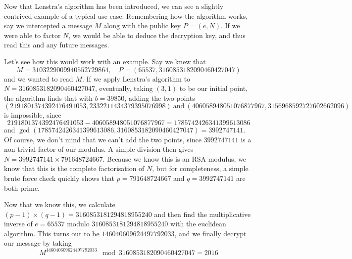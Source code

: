 
Now that Lenstra's algorithm has been introduced, we can see a slightly contrived example of a typical use case. Remembering how the algorithm works, say we intercepted a message $M$ along with the public key $P = (e,N)$. If we were able to factor $N$, we would be able to deduce the decryption key, and thus read this and any future messages. 

Let's see how this would work with an example. Say we knew that
$$ M = 3103229009940552729864,\quad P = (65537, 3160853182090460427047) $$
and we wanted to read $M$. If we apply Lenstra's algorithm to $N = 3160853182090460427047$, eventually, taking $(3,1)$ to be our initial point, the algorithm finds that with $b = 39850$, adding the two points
$$(2191801374392476491053, 2332211434379395076998)\ \text{and}\ (406058948051076877967, 3156968592727602662096)$$
is impossible, since 
$$2191801374392476491053-406058948051076877967 = 1785742426341399613086$$ and $\gcd(1785742426341399613086, 3160853182090460427047) = 3992747141$. Of course, we don't mind that we can't add the two points, since $3992747141$ is a non-trivial factor of our modulus. A simple division then gives $N = 3992747141 \times 791648724667$. Because we know this is an RSA modulus, we know that this is the complete factorisation of $N$, but for completeness, a simple brute force check quickly shows that $p = 791648724667$ and $q = 3992747141$ are both prime.

Now that we know this, we calculate $(p-1) \times (q-1) = 3160853181294818955240$ and then find the multiplicative inverse of $e = 65537$ modulo $3160853181294818955240$ with the euclidean algorithm. This turns out to be $146040609624497792033$, and we finally decrypt our message by taking
$$ M^{146040609624497792033} \mod 3160853182090460427047 =2016 $$
